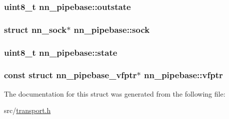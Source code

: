 \subsubsection[{outstate}]{\setlength{\rightskip}{0pt plus 5cm}uint8\+\_\+t nn\+\_\+pipebase\+::outstate}\hypertarget{structnn__pipebase_a47e77991eaa37e441330fb93bc86a3da}{}\label{structnn__pipebase_a47e77991eaa37e441330fb93bc86a3da}
\subsubsection[{sock}]{\setlength{\rightskip}{0pt plus 5cm}struct {\bf nn\+\_\+sock}$\ast$ nn\+\_\+pipebase\+::sock}\hypertarget{structnn__pipebase_a9dd997f470c0632dd53246da77092c0c}{}\label{structnn__pipebase_a9dd997f470c0632dd53246da77092c0c}
\subsubsection[{state}]{\setlength{\rightskip}{0pt plus 5cm}uint8\+\_\+t nn\+\_\+pipebase\+::state}\hypertarget{structnn__pipebase_ae266ebdd9c1dcd033e997be9049e5861}{}\label{structnn__pipebase_ae266ebdd9c1dcd033e997be9049e5861}
\subsubsection[{vfptr}]{\setlength{\rightskip}{0pt plus 5cm}const struct {\bf nn\+\_\+pipebase\+\_\+vfptr}$\ast$ nn\+\_\+pipebase\+::vfptr}\hypertarget{structnn__pipebase_aeafca3d6f7ede1312294d1b768130adb}{}\label{structnn__pipebase_aeafca3d6f7ede1312294d1b768130adb}


The documentation for this struct was generated from the following file\+:\begin{DoxyCompactItemize}
\item 
src/\hyperlink{transport_8h}{transport.\+h}\end{DoxyCompactItemize}
